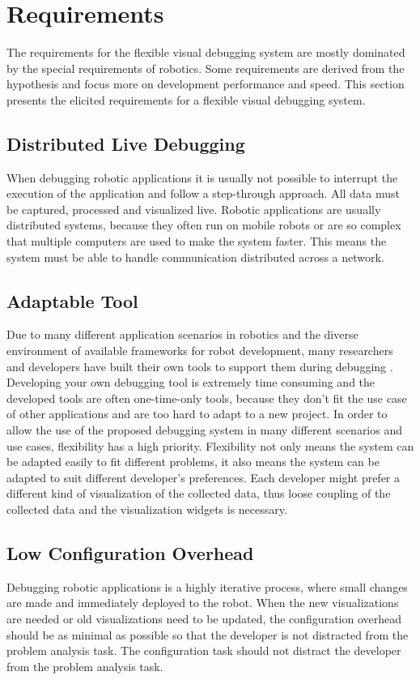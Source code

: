 \section{Requirements}
\label{requirements}
The requirements for the flexible visual debugging system are mostly dominated by the special requirements of robotics. Some requirements are derived from the hypothesis and focus more on development performance and speed. This section presents the elicited requirements for a flexible visual debugging system.

\subsection{Distributed Live Debugging}
When debugging robotic applications it is usually not possible to interrupt the execution of the application and follow a step-through approach. All data must be captured, processed and visualized live. Robotic applications are usually distributed systems, because they often run on mobile robots or are so complex that multiple computers are used to make the system faster. This means the system must be able to handle communication distributed across a network.

\subsection{Adaptable Tool}
Due to many different application scenarios in robotics and the diverse environment of available frameworks for robot development, many researchers and developers have built their own tools to support them during debugging \cite{Collett2010}. Developing your own debugging tool is extremely time consuming and the developed tools are often one-time-only tools, because they don't fit the use case of other applications and are too hard to adapt to a new project.
In order to allow the use of the proposed debugging system in many different scenarios and use cases, flexibility has a high priority. Flexibility not only means the system can be adapted easily to fit different problems, it also means the system can be adapted to suit different developer's preferences. Each developer might prefer a different kind of visualization of the collected data, thus loose coupling of the collected data and the visualization widgets is necessary.

\subsection{Low Configuration Overhead}
Debugging robotic applications is a highly iterative process, where small changes are made and immediately deployed to the robot. When the new visualizations are needed or old visualizations need to be updated, the configuration overhead should be as minimal as possible so that the developer is not distracted from the problem analysis task. The configuration task should not distract the developer from the problem analysis task.

